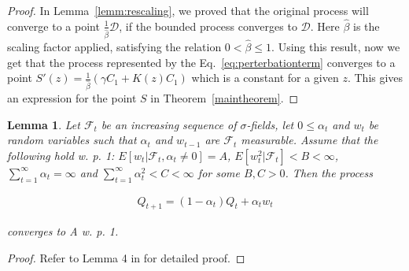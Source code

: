 \documentclass[jair, twoside,11pt,theapa]{article}
\newtheorem{lemm2}{Lemma}
\begin{document}
\begin{proof}
In Lemma~\ref{lemm:rescaling}, we proved that the original process will converge to a point $\frac{1}{\hat{\beta}} \mathcal{D}$, if the bounded process converges to $\mathcal{D}$. Here $\hat{\beta}$ is the scaling factor applied, satisfying the relation $0 < \hat{\beta} \leq 1$. Using this result, now we get that the process represented by the Eq.~\ref{eq:perterbationterm} converges to a point $S'(z) = \frac{1}{\hat{\beta}} (\gamma C_1 + K(z) C_1) $ which is a constant for a given $z$. This gives an expression for the point $S$ in Theorem~\ref{maintheorem}. 




\end{proof}

\begin{lemm2}
Let $\mathcal{F}_t$ be an increasing sequence of $\sigma$-fields, let $0\leq \alpha_t$ and $w_t$ be random variables such that $\alpha_t$ and $w_{t-1}$ are $\mathcal{F}_t$ measurable. Assume that the following hold w. p. 1: $E[w_t|\mathcal{F}_t, \alpha_t \neq 0] = A$, $E[w^2_t|\mathcal{F}_t] < B < \infty$, $\sum_{t=1}^{\infty} \alpha_t = \infty$ and $\sum_{t=1}^{\infty} \alpha^2_t < C < \infty$ for some $B,C > 0$. Then the process 

\begin{equation*}
    \begin{array}{l}
         Q_{t+1} = (1 - \alpha_t)Q_t + \alpha_t w_t
    \end{array}
\end{equation*}

\noindent converges to A w. p. 1. 

\end{lemm2}

\begin{proof}
Refer to Lemma 4 in \cite{szepesvari1999unified} for detailed proof. 
\end{proof}
\end{document}
